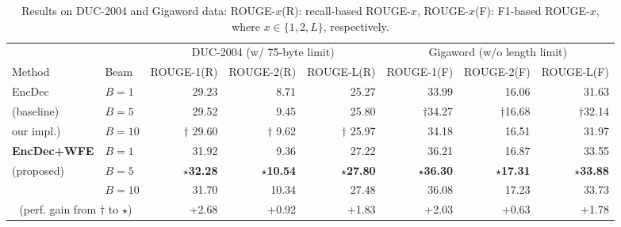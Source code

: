 \documentclass[11pt]{article}
\begin{document}
\begin{table*}[t]
 \small
 \centering
  \tabcolsep=2pt
  \begin{tabular}{ l  l || r | r | r || r | r | r  }
   \hline
   \      &       & \multicolumn{3}{c||}{DUC-2004 (w/ 75-byte limit)}
                  & \multicolumn{3}{c}{Gigaword (w/o length limit)}\\
   Method & Beam & ROUGE-1(R) & ROUGE-2(R) & ROUGE-L(R)  &  ROUGE-1(F) & ROUGE-2(F) & ROUGE-L(F) \\
   \hline
   EncDec                       &$B\!\!=\!\!1$    &          29.23  &             8.71  &           25.27 &           33.99  &           16.06  &           31.63\\
   (baseline)                  &$B\!\!=\!\!5$    &          29.52  &             9.45  &           25.80 &  $\dagger$34.27  &  $\dagger$16.68  &  $\dagger$32.14\\
   \hspace{1mm}our impl.)       &$B\!\!=\!\!10$   &$\dagger$ 29.60  &$\dagger$    9.62  &$\dagger$  25.97 &           34.18  &           16.51  &           31.97\\
   \hline
   \bf EncDec+WFE               &$B\!\!=\!\!1$    &          31.92  &             9.36  &           27.22 &           36.21  &           16.87  &           33.55\\
   (proposed)                   &$B\!\!=\!\!5$    &$\star$\bf 32.28 &$\star$\bf  10.54  &$\star$\bf 27.80 &$\star$\bf 36.30  &$\star$\bf 17.31  &$\star$\bf 33.88\\
   \                            &$B\!\!=\!\!10$   &          31.70  &            10.34  &           27.48 &           36.08  &           17.23  &           33.73\\
   \hline
   \hline
   \multicolumn{2}{c|}{ (perf. gain from $\dagger$ to $\star$)}
                              &      +2.68 &  +0.92 &   +1.83           &   +2.03 &  +0.63 &   +1.78 \\
   \hline
  \end{tabular}
 \caption{Results on DUC-2004 and Gigaword data: ROUGE-$x$(R): recall-based ROUGE-$x$, ROUGE-$x$(F): F1-based ROUGE-$x$, where $x\in\{1,2,L\}$, respectively.}
 \label{table:result_duc2004}
\end{table*}
\end{document}
